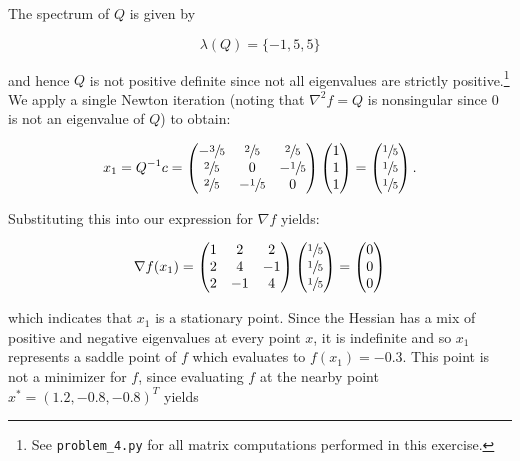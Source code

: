 \begin{solution}
    The spectrum of $Q$ is given by 

    $$
    \lambda(Q) = \{ -1, 5, 5 \}
    $$

    and hence $Q$ is not positive definite since not all eigenvalues are strictly positive.\footnote{
        See \texttt{problem\_4.py} for all matrix computations performed in this exercise.
    } We apply a single Newton iteration (noting that $\nabla^2 f = Q$ is nonsingular since 0 is not an eigenvalue of 
    $Q$) to obtain:

    $$
    x_1 = Q^{-1} c = \begin{pmatrix}
        -\sfrac{3}{5} &  \sfrac{2}{5} &  \sfrac{2}{5} \\
         \sfrac{2}{5} &  0            & -\sfrac{1}{5} \\
         \sfrac{2}{5} & -\sfrac{1}{5} &  0            \\
    \end{pmatrix} \begin{pmatrix}
        1 \\
        1 \\
        1
    \end{pmatrix} = \begin{pmatrix}
        \sfrac{1}{5} \\
        \sfrac{1}{5} \\
        \sfrac{1}{5}
    \end{pmatrix}.
    $$

    Substituting this into our expression for $\nabla f$ yields:

    $$
    \nabla f(x_1) = \begin{pmatrix}
        1 &  2 &  2 \\
        2 &  4 & -1 \\
        2 & -1 & 4
    \end{pmatrix} \begin{pmatrix}
        \sfrac{1}{5} \\
        \sfrac{1}{5} \\
        \sfrac{1}{5}
    \end{pmatrix} = \begin{pmatrix}
        0 \\
        0 \\
        0
    \end{pmatrix}
    $$

    which indicates that $x_1$ is a stationary point. Since the Hessian has a mix of positive and negative eigenvalues
    at every point $x$, it is indefinite and so $x_1$ represents a saddle point of $f$ which evaluates to 
    $f(x_1) = -0.3$. This point is not a minimizer for $f$, since evaluating $f$ at the nearby point 
    $x^* = (1.2, -0.8, -0.8 )^T$ yields 
    

\end{solution}
